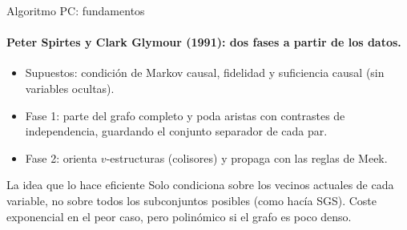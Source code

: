 \documentclass[aspectratio=169,11pt]{beamer}
\begin{document}
\begin{frame}[t]{Algoritmo PC: fundamentos}
  \framesubtitle{Peter Spirtes y Clark Glymour (1991): dos fases a partir de los datos.}
  \begin{center}
  \end{center}
  \begin{itemize}
    \item Supuestos: condición de Markov causal, fidelidad y suficiencia
          causal (sin variables ocultas).
    \item Fase 1: parte del grafo completo y poda aristas con contrastes de
          independencia, guardando el conjunto separador de cada par.
    \item Fase 2: orienta $v$-estructuras (colisores) y propaga con las reglas
          de Meek.
  \end{itemize}
  \begin{alertblock}{La idea que lo hace eficiente}
    Solo condiciona sobre los vecinos actuales de cada variable, no sobre
    todos los subconjuntos posibles (como hacía SGS). Coste exponencial en el
    peor caso, pero polinómico si el grafo es poco denso.
  \end{alertblock}
\end{frame}
\end{document}

